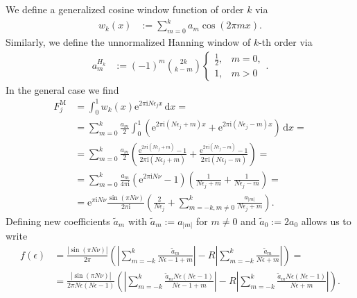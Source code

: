 \documentclass[english, parskip=full]{scrartcl}     %
\newcommand{\intx}{}
\newcommand{\kla}{}
\newcommand{\tecxt}{}
\renewcommand{\i}{\text{i}}
\newcommand{\e}{\text{e}}
\begin{document}
We define a generalized cosine window function of order $k$ via
\begin{align}
w_k(x) &:= \sum_{m=0}^k a_m \cos (2\pi mx). \label{eqn:definition generalized cosine window}
\end{align}
Similarly, we define the unnormalized Hanning window of $k$-th order via
\begin{align}
a_m^{H_k} &:= (-1)^m \binom{2k}{k - m} \begin{cases} \frac{1}{2}, & m=0,\\ 1, & m>0 \end{cases} .
\end{align}
In the general case we find
\begin{align}
F_j^\tecxt\text{M} &= \intx\int_{0}^{1} w_{k}(x) \e^{2\pi\i N\epsilon_j x} \, \mathrm{d}x = \\
&= \sum_{m=0}^k \frac{a_m}{2} \intx\int_{0}^{1} \kla\left( \e^{2\pi\i (N\epsilon_j + m) x} + \e^{2\pi\i (N\epsilon_j - m) x} \right)\, \mathrm{d}x = \\
&= \sum_{m=0}^k \frac{a_m}{2} \kla\left( \frac{\e^{2\pi\i (N\epsilon_j + m)} - 1}{2\pi\i (N\epsilon_j + m)} + \frac{\e^{2\pi\i (N\epsilon_j - m)} - 1}{2\pi\i (N\epsilon_j - m)} \right) = \\
&= \sum_{m=0}^k \frac{a_m}{4\pi\i} \kla\left( \e^{2\pi\i N\nu} - 1 \right) \kla\left( \frac{1}{N\epsilon_j + m} + \frac{1}{N\epsilon_j - m} \right) = \\
&= \e^{\pi\i N\nu} \frac{\sin(\pi N\nu)}{2\pi\i} \kla\left( \frac{2}{N\epsilon_j} + \sum_{m=-k, m\neq 0}^k \frac{a_{|m|}}{N\epsilon_j + m} \right).
\end{align}
Defining new coefficients $\tilde{a}_m$ with $\tilde{a}_m := a_{|m|}$ for $m\neq 0$ and $\tilde{a}_0 := 2a_0$ allows us to write
\begin{align}
f(\epsilon) &= \frac{\left\vert \sin\kla\left( \pi N\nu \right) \right\vert }{2\pi} \kla\left( \left\vert \sum_{m=-k}^k \frac{\tilde{a}_m}{N\epsilon - 1 + m} \right\vert - R \left\vert \sum_{m=-k}^k \frac{\tilde{a}_m}{N\epsilon + m} \right\vert \right) = \\
&= \frac{\left\vert \sin\kla\left( \pi N\nu \right) \right\vert }{2\pi N\epsilon (N\epsilon - 1)} \kla\left( \left\vert \sum_{m=-k}^k \frac{\tilde{a}_m N\epsilon (N\epsilon - 1)}{N\epsilon - 1 + m} \right\vert - R \left\vert \sum_{m=-k}^k \frac{\tilde{a}_m N\epsilon (N\epsilon - 1)}{N\epsilon + m} \right\vert \right).
\end{align}
\end{document}
